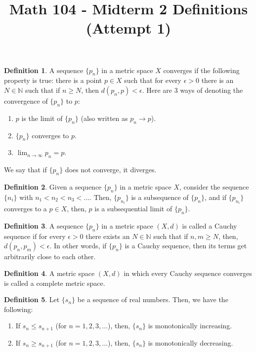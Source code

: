 \documentclass[12pt]{article}
\theoremstyle{definition}
\newtheorem{definition}{Definition}
\theoremstyle{named}
\begin{document}
\title{Math 104 - Midterm 2 Definitions (Attempt 1)}
\author{}
\date{}
\maketitle
\date

\renewcommand{\thedefinition}{3.1}
\begin{definition}
    A sequence $\{p_n\}$ in a metric space $X$ converges if the following property is true: there is a point $p \in X$ such that for every $\epsilon > 0$ there is an $N \in \mathbb{N}$ such that if $n \geq N$, then $d\left(p_n,p\right) < \epsilon$. Here are 3 ways of denoting the convergence of $\{p_n\}$ to $p$: 
    \begin{enumerate}
        \item $p$ is the limit of $\{p_n\}$ (also written as $p_n \to p$). 
        \item $\{p_n\}$ converges to $p$. 
        \item $\lim_{n \to \infty} p_n = p$. 
    \end{enumerate}
    We say that if $\{p_n\}$ does not converge, it diverges. 
\end{definition}

\renewcommand{\thedefinition}{3.5}
\begin{definition}
    Given a sequence $\{p_n\}$ in a metric space $X$, consider the sequence $\{n_i\}$ with $n_1 < n_2 < n_3 < \dots$. Then, $\{p_{n_i}\}$ is a subsequence of $\{p_n\}$, and if $\{p_{n_i}\}$ converges to a $p \in X$, then, $p$ is a subsequential limit of $\{p_n\}$. 
\end{definition}

\renewcommand{\thedefinition}{3.8}
\begin{definition}
    A sequence $\{p_n\}$ in a metric space $(X,d)$ is called a Cauchy sequence if for every $\epsilon > 0$ there exists an $N \in \mathbb{N}$ such that if $n, m \geq N$, then, $d\left(p_n, p_m\right) < \epsilon$. In other words, if $\{p_n\}$ is a Cauchy sequence, then its terms get arbitrarily close to each other. 
\end{definition}

\renewcommand{\thedefinition}{3.12}
\begin{definition}
    A metric space $(X,d)$ in which every Cauchy sequence converges is called a complete metric space. 
\end{definition}

\renewcommand{\thedefinition}{3.13}
\begin{definition}
    Let $\{s_n\}$ be a sequence of real numbers. Then, we have the following: 
    \begin{enumerate}
        \item If $s_n \leq s_{n+1}$ (for $n=1,2,3,\dots$), then, $\{s_n\}$ is monotonically increasing. 
        \item If $s_n \geq s_{n+1}$ (for $n=1,2,3,\dots$), then, $\{s_n\}$ is monotonically decreasing. 
    \end{enumerate}
\end{definition}
\end{document}
